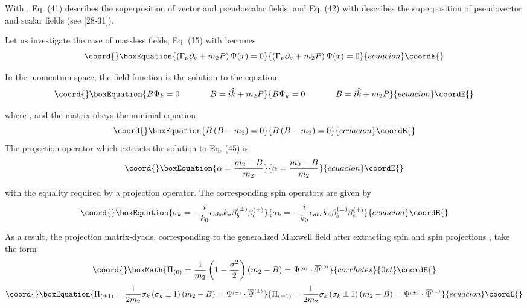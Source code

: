 \documentclass[a4paper,12pt]{article}
\begin{document}
With \myHighlight{$\varepsilon =\overline{\varepsilon }$}\coordHE{}, Eq. (41) describes
the superposition of vector and pseudoscalar fields, and Eq. (42)
with \myHighlight{$ \varepsilon =-\overline{\varepsilon }$}\coordHE{} describes the
superposition of pseudovector and scalar fields (see [28-31]).

Let us investigate the case of massless fields; Eq. (15) with \coordHE{}
becomes
\begin{equation}\coord{}\boxEquation{
\left( \Gamma _\nu \partial _\nu +m_2P\right) \Psi (x)=0  \label{44}
}{
\left( \Gamma _\nu \partial _\nu +m_2P\right) \Psi (x)=0  }{ecuacion}\coordE{}\end{equation}

In the momentum space, the field function \coordHE{} is the solution to the
equation
\begin{equation}\coord{}\boxEquation{
B\Psi _k=0\hspace{0.5in}B=i\widehat{k}+m_2P  \label{45}
}{
B\Psi _k=0\hspace{0.5in}B=i\widehat{k}+m_2P  }{ecuacion}\coordE{}\end{equation}

where \coordHE{}, \coordHE{} and the matrix \coordHE{}
obeys the minimal equation
\begin{equation}\coord{}\boxEquation{
B\left( B-m_2\right) =0  \label{46}
}{
B\left( B-m_2\right) =0  }{ecuacion}\coordE{}\end{equation}
The projection operator which extracts the solution to Eq. (45) is
\begin{equation}\coord{}\boxEquation{
\alpha =\frac{m_2-B}{m_2}  \label{47}
}{
\alpha =\frac{m_2-B}{m_2}  }{ecuacion}\coordE{}\end{equation}

with the equality \coordHE{} required by a projection operator. The
corresponding spin operators are given by
\begin{equation}\coord{}\boxEquation{
\sigma _k=-\frac i{k_0}\epsilon _{abc}k_a\beta _b^{(\pm )}\beta _c^{(\pm )}
\label{48}
}{
\sigma _k=-\frac i{k_0}\epsilon _{abc}k_a\beta _b^{(\pm )}\beta _c^{(\pm )}
}{ecuacion}\coordE{}\end{equation}

As a result, the projection matrix-dyads, corresponding to the generalized
Maxwell field after extracting spin \coordHE{} and spin projections \coordHE{}, take
the form
\[\coord{}\boxMath{
\Pi _{(0)}=\frac 1{m_2}\left( 1-\frac{\sigma ^2}2\right) \left( m_2-B\right)
=\Psi ^{_{(0)}}\cdot \overline{\Psi }^{_{(0)}}
}{corchetes}{0pt}\coordE{}\]
\begin{equation}\coord{}\boxEquation{
\Pi _{(\pm 1)}=\frac 1{2m_2}\sigma _k\left( \sigma _k\pm 1\right) \left(
m_2-B\right) =\Psi ^{_{(\pm )}}\cdot \overline{\Psi }^{_{(\pm )}}  \label{49}
}{
\Pi _{(\pm 1)}=\frac 1{2m_2}\sigma _k\left( \sigma _k\pm 1\right) \left(
m_2-B\right) =\Psi ^{_{(\pm )}}\cdot \overline{\Psi }^{_{(\pm )}}  }{ecuacion}\coordE{}\end{equation}
\end{document}

